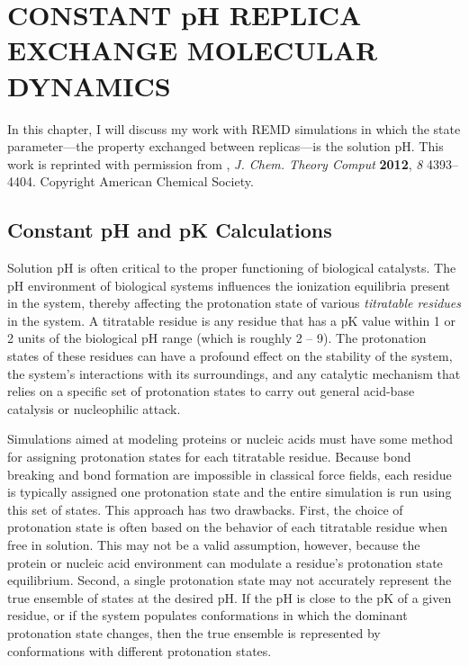\chapter{CONSTANT pH REPLICA EXCHANGE MOLECULAR DYNAMICS}
\label{ch3}

In this chapter, I will discuss my work with REMD simulations in which the state
parameter---the property exchanged between replicas---is the solution pH.  This
work is reprinted with permission from
\citeauthor*{Swails_JChemTheoryComput_2012_v8_p4393}, \emph{J. Chem. Theory
Comput} \textbf{2012}, \emph{8} 4393--4404. Copyright
\citeyear{Swails_JChemTheoryComput_2012_v8_p4393} American Chemical Society.
\cite{Swails_JChemTheoryComput_2012_v8_p4393}

\section{Constant pH and pK Calculations}

Solution pH is often critical to the proper functioning of biological catalysts.
\cite{Cornish-Bowden1969,White1959} The pH environment of biological systems
influences the ionization equilibria present in the system, thereby affecting
the protonation state of various \emph{titratable residues} in the system. A
titratable residue is any residue that has a pK value within 1 or 2 units
of the biological pH range (which is roughly 2 -- 9). The protonation states of
these residues can have a profound effect on the stability of the system, the
system's interactions with its surroundings, and any catalytic mechanism that
relies on a specific set of protonation states to carry out general acid-base
catalysis or nucleophilic attack. \cite{Tanford_JAmChemSoc_1957_v79_p5333}

Simulations aimed at modeling proteins or nucleic acids must have some method
for assigning protonation states for each titratable residue. Because bond
breaking and bond formation are impossible in classical force fields, each
residue is typically assigned one protonation state and the entire simulation is
run using this set of states. This approach has two drawbacks. First, the
choice of protonation state is often based on the behavior of each titratable
residue when free in solution. This may not be a valid assumption, however,
because the protein or nucleic acid environment can modulate a residue's
protonation state equilibrium. Second, a single protonation state may not
accurately represent the true ensemble of states at the desired pH. If the pH
is close to the pK of a given residue, or if the system populates
conformations in which the dominant protonation state changes, then the true
ensemble is represented by conformations with different protonation states.

